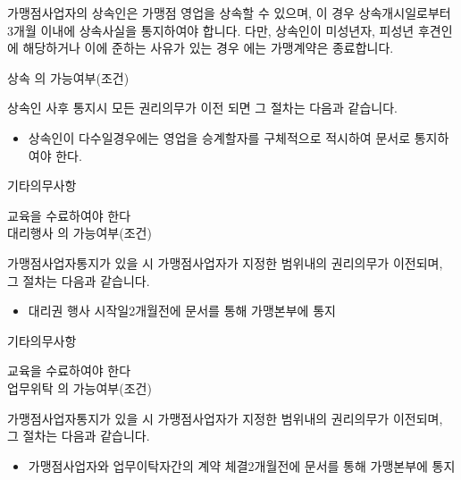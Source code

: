\documentclass[a5paper,10pt]{oblivoir}
\begin{document}
\begin{enumerate}
\begin{enumerate}
가맹점사업자의 상속인은 가맹점 영업을 상속할 수 있으며, 이 경우 상속개시일로부터 3개월 이내에 상속사실을 통지하여야 합니다. 다만, 상속인이 미성년자, 피성년 후견인에 해당하거나 이에 준하는 사유가 있는 경우 에는 가맹계약은 종료합니다.
\end{enumerate}
\begin{tiny}
\begin{Form}
\def\LayoutCheckField#1#2{%
  \parbox[c][5mm]{5mm}{\centering\footnotesize\strut #1\\#2}%
}
\def\LayoutCheckField#1#2{%
  \makebox[0pt][l]{%
    \makebox[5mm][c]{\footnotesize\strut #1}%
  }%
  #2%
}
\def\DefaultHeightofCheckBox{5mm}
\def\DefaultWidthofCheckBox{5mm}


 상속 의 가능여부(조건)

\noindent\dotfill 

 상속인 사후 통지시 모든 권리의무가 이전 되면 그 절차는 다음과 같습니다.

\begin{itemize}
 사망시 그 상속인은 상속개시일로부터2개월 이내에 승계의 의사를 가맹본에게 서면으로 통지하고 본 가맹점영업을 계속할 수 있다.
\item 상속인이 다수일경우에는 영업을 승계할자를 구체적으로 적시하여 문서로 통지하여야 한다.
\end{itemize}

 기타의무사항

\noindent\dotfill 
 교육을 수료하여야 한다
\\

 대리행사 의 가능여부(조건)

\noindent\dotfill 

 가맹점사업자통지가 있을 시 가맹점사업자가 지정한 범위내의 권리의무가 이전되며, 그 절차는 다음과 같습니다.

\begin{itemize}
\item 대리권 행사 시작일2개월전에 문서를 통해 가맹본부에 통지
\end{itemize}

 기타의무사항

\noindent\dotfill 
 교육을 수료하여야 한다
\\

 업무위탁 의 가능여부(조건)

\noindent\dotfill 

 가맹점사업자통지가 있을 시 가맹점사업자가 지정한 범위내의 권리의무가 이전되며, 그 절차는 다음과 같습니다.

\begin{itemize}
\item 가맹점사업자와 업무이탁자간의 계약 체결2개월전에 문서를 통해 가맹본부에 통지
\end{itemize}


\end{Form}
\end{tiny}
\end{enumerate}
\end{document}

